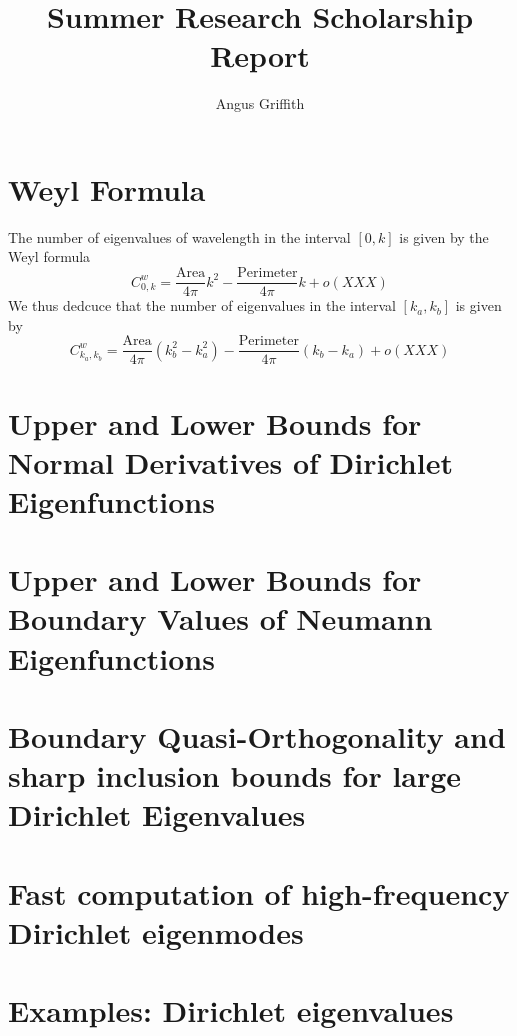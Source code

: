 \documentclass{article}
\author{Angus Griffith}
\title{Summer Research Scholarship Report}
\begin{document}
\section{Weyl Formula}
The number of eigenvalues of wavelength in the interval $[0,k]$ is given by the Weyl formula
\begin{equation}
C^w_{0,k} = \frac{\mbox{Area}}{4 \pi} k^2 - \frac{\mbox{Perimeter}}{4 \pi} k + o(XXX)
\end{equation}
We thus dedcuce that the number of eigenvalues in the interval $[k_a, k_b]$ is given by
\begin{equation}
C^w_{k_a,k_b} = \frac{\mbox{Area}}{4 \pi} (k_b^2 -k_a^2) - \frac{\mbox{Perimeter}}{4 \pi} (k_b - k_a) + o(XXX)
\end{equation}
\section{Upper and Lower Bounds for Normal Derivatives of Dirichlet Eigenfunctions}
\cite{HT02}

\section{Upper and Lower Bounds for Boundary Values of Neumann Eigenfunctions}
\cite{BHXX}

\section{Boundary Quasi-Orthogonality and sharp inclusion bounds for large Dirichlet Eigenvalues}
\cite{BH11}

\section{Fast computation of high-frequency Dirichlet eigenmodes}
\cite{BH14}

\section{Examples: Dirichlet eigenvalues}
\end{document}
